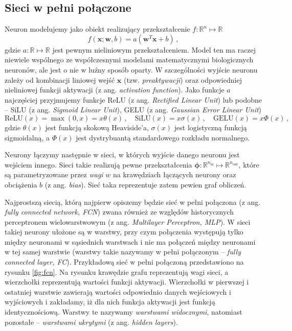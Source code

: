 \documentclass{myclass}
\numberwithin{equation}{subsection}
\begin{document}
\subsection{Sieci w pełni połączone}

Neuron modelujemy jako obiekt realizujący przekształcenie \(f: \mathbb{R}^n \mapsto \mathbb{R}\)
\[
f(\bm{x}; \bm{w}, b) = a\left( \bm{w}^T\bm{x} + b \right)\,,
\]
gdzie \(a: \mathbb{R} \mapsto \mathbb{R}\) jest pewnym nieliniowym przekształceniem. Model ten ma
raczej niewiele wspólnego ze współczesnymi modelami matematycznymi biologicznych neuronów, ale jest
o nie w luźny sposób oparty. W szczególności wyjście neuronu zależy od kombinacji liniowej wejść
\(\bm{x}\) (tzw. \textit{preaktywacji}) oraz odpowiedniej nieliniowej funkcji aktywacji (z ang.
\textit{activation function}). Jako funkcje \(a\) najczęściej przyjmujemy funkcje ReLU (z ang.
\textit{Rectified Linear Unit}) lub podobne -- SiLU (z ang. \textit{Sigmoid Linear Unit}), GELU (z
ang. \textit{Gaussian Error Linear Unit})
\[
\mathrm{ReLU}(x) = \max(0, x) = x\theta(x)\,,\quad \mathrm{SiLU}(x) = x \sigma(x)\,,\quad \mathrm{GELU}(x) = x \Phi(x)\,,
\]
gdzie \(\theta(x)\) jest funkcją skokową Heaviside'a, \(\sigma(x)\) jest logistyczną funkcją
sigmoidalną, a \(\Phi(x)\) jest dystrybuantą standardowego rozkładu normalnego.

Neurony łączymy następnie w sieci, w których wyjście danego neuronu jest wejściem innego. Sieci
takie realizują pewne przekształcenia \(\bm{\phi}: \mathbb{R}^{n_\text{in}} \mapsto
\mathbb{R}^{n_\text{out}}\), które są parametryzowane przez \emph{wagi} \(w\) na krawędziach
łączących neurony oraz obciążenia \(b\) (z ang. \textit{bias}). Sieć taka reprezentuje zatem pewien
graf obliczeń. 

Najprostszą siecią, którą najpierw opiszemy będzie sieć w pełni połączona (z ang. \textit{fully
connected network, FCN}) zwana również ze względów historycznych perceptronem wielowarstwowym (z
ang. \textit{Multilayer Perceptron, MLP}). W sieci takiej neurony ułożone są w warstwy, przy czym
połączenia występują tylko między neuronami w sąsiednich warstwach i nie ma połączeń między
neuronami w tej samej warstwie (warstwy takie nazywamy w pełni połączonym -- \textit{fully connected
layer, FC}). Przykładową sieć w pełni połączoną przedstawiono na rysunku \ref{fig:fcn}. Na rysunku
krawędzie grafu reprezentują wagi sieci, a wierzchołki reprezentują wartości funkcji aktywacji.
Wierzchołki w pierwszej i ostatniej warstwie zawierają wartości odpowiednio danych wejściowych i
wyjściowych i zakładamy, iż dla nich funkcja aktywacji jest funkcją identycznościową. Warstwy te
nazywamy \emph{warstwami widocznymi}, natomiast pozostałe -- \emph{warstwami ukrytymi} (z ang.
\textit{hidden layers}). 
\end{document}
